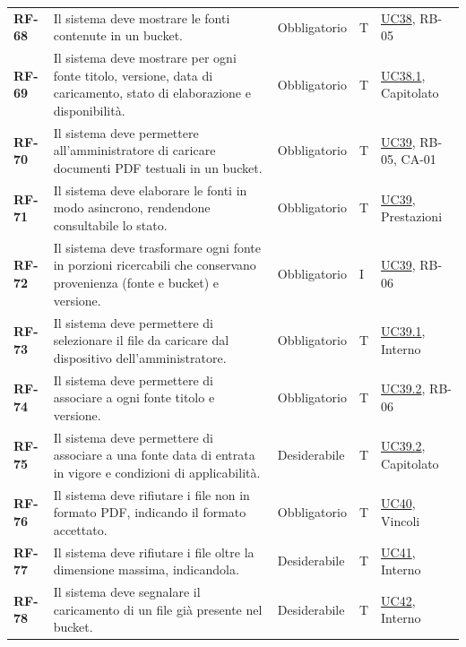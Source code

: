 \documentclass[documento]{gpt}
\begin{document}
{\begin{longtable}{@{}>{\raggedright\arraybackslash}p{1.35cm}>{\raggedright\arraybackslash}p{7.3cm}>{\raggedright\arraybackslash}p{1.9cm}>{\centering\arraybackslash}p{0.75cm}>{\raggedright\arraybackslash}p{3.1cm}@{}}
\leavevmode\hypertarget{req:RF-68}{\textbf{RF-68}} & Il sistema deve mostrare le fonti contenute in un bucket. & Obbligatorio & T & \hyperref[uc:fn_elenco]{UC38}, \mbox{RB-05} \\
\leavevmode\hypertarget{req:RF-69}{\textbf{RF-69}} & Il sistema deve mostrare per ogni fonte titolo, versione, data di caricamento, stato di elaborazione e disponibilità. & Obbligatorio & T & \hyperref[uc:fn_elem]{UC38.1}, \mbox{Capitolato} \\
\leavevmode\hypertarget{req:RF-70}{\textbf{RF-70}} & Il sistema deve permettere all’amministratore di caricare documenti PDF testuali in un bucket. & Obbligatorio & T & \hyperref[uc:fn_carica]{UC39}, \mbox{RB-05}, \mbox{CA-01} \\
\leavevmode\hypertarget{req:RF-71}{\textbf{RF-71}} & Il sistema deve elaborare le fonti in modo asincrono, rendendone consultabile lo stato. & Obbligatorio & T & \hyperref[uc:fn_carica]{UC39}, \mbox{Prestazioni} \\
\leavevmode\hypertarget{req:RF-72}{\textbf{RF-72}} & Il sistema deve trasformare ogni fonte in porzioni ricercabili che conservano provenienza (fonte e bucket) e versione. & Obbligatorio & I & \hyperref[uc:fn_carica]{UC39}, \mbox{RB-06} \\
\leavevmode\hypertarget{req:RF-73}{\textbf{RF-73}} & Il sistema deve permettere di selezionare il file da caricare dal dispositivo dell’amministratore. & Obbligatorio & T & \hyperref[uc:fn_file]{UC39.1}, \mbox{Interno} \\
\leavevmode\hypertarget{req:RF-74}{\textbf{RF-74}} & Il sistema deve permettere di associare a ogni fonte titolo e versione. & Obbligatorio & T & \hyperref[uc:fn_meta]{UC39.2}, \mbox{RB-06} \\
\leavevmode\hypertarget{req:RF-75}{\textbf{RF-75}} & Il sistema deve permettere di associare a una fonte data di entrata in vigore e condizioni di applicabilità. & Desiderabile & T & \hyperref[uc:fn_meta]{UC39.2}, \mbox{Capitolato} \\
\leavevmode\hypertarget{req:RF-76}{\textbf{RF-76}} & Il sistema deve rifiutare i file non in formato PDF, indicando il formato accettato. & Obbligatorio & T & \hyperref[uc:fn_formato]{UC40}, \mbox{Vincoli} \\
\leavevmode\hypertarget{req:RF-77}{\textbf{RF-77}} & Il sistema deve rifiutare i file oltre la dimensione massima, indicandola. & Desiderabile & T & \hyperref[uc:fn_dim]{UC41}, \mbox{Interno} \\
\leavevmode\hypertarget{req:RF-78}{\textbf{RF-78}} & Il sistema deve segnalare il caricamento di un file già presente nel bucket. & Desiderabile & T & \hyperref[uc:fn_dup]{UC42}, \mbox{Interno} \\

\end{longtable}}
\end{document}
